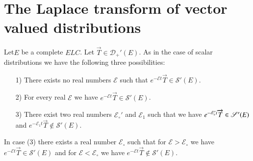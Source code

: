 
\chapter{The Laplace transform of vector valued
  distributions}\label{chap9}

Let\pageoriginale $E$ be a complete $E L C$. Let $\overrightarrow{T}
\in \mathscr{D}_+'(E)$. As in the case of scalar distributions we have
the following three possibilities:
\begin{itemize}
\item [1)] There exists no real numbers $\mathscr{E}$ such that
  $e^{-\mathscr{E} t}\overrightarrow{T} \in \mathscr{S}'(E)$.
\item [2)] For every real $\mathscr{E}$ we have
  $e^{-\mathscr{E}t}\overrightarrow{T} \in \mathscr{S}'(E)$.
\item [3)] There exist two real numbers $\mathscr{E}_\circ'$ and
  $\mathscr{E}_1$ such that we have $e^{-{\mathscr{E}}_\circ't}\break
  \overrightarrow{T} \in \mathscr{S}' (E)$ and $e^{-{\mathscr{E}}_1 t}
  \overrightarrow{T} \notin \mathscr{S}' (E)$.
\end{itemize}

\setcounter{section}{9}
\setcounter{prop}{0}
\begin{prop}\label{chap9:prop9.1}
In case (3) there exists a real number $\mathscr{E}_\circ$ such that
for $\mathscr{E} > \mathscr{E}_\circ$ we have
$e^{-\mathscr{E}t}\overrightarrow{T} \in \mathscr{S}'(E)$ and for
$\mathscr{E} < \mathscr{E}_\circ$ we have
$e^{-\mathscr{E}t}\overrightarrow{T} \notin \mathscr{S}'(E)$.
\end{prop}

